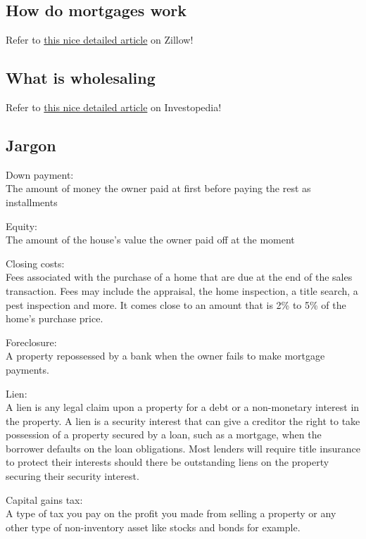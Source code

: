 \documentclass[12pt]{article}
\newcommand{\jargon}[1]{{\large\noindent\color{red} #1:}}
\begin{document}
\subsection{How do mortgages work}
Refer to \href{https://www.zillow.com/mortgage-learning/what-is-a-mortgage/}{this nice detailed article} on Zillow!
\subsection{What is wholesaling}
Refer to \href{https://www.investopedia.com/ask/answers/100214/what-goal-real-estate-wholesaling.asp}{this nice detailed article} on Investopedia!

\subsection{Jargon}
\jargon{Down payment} \\
The amount of money the owner paid at first before paying the rest as installments
\vspace{1em}

\jargon{Equity} \\
The amount of the house's value the owner paid off at the moment
\vspace{1em}

\jargon{Closing costs} \\
Fees associated with the purchase of a home that are due at the end of the sales transaction. Fees may include the appraisal, the home inspection, a title search, a pest inspection and more. It comes close to an amount that is 2\% to 5\% of the home’s purchase price.
\vspace{1em}

\jargon{Foreclosure} \\
A property repossessed by a bank when the owner fails to make mortgage payments. 
\vspace{1em}

\jargon{Lien} \\
A lien is any legal claim upon a property for a debt or a non-monetary interest in the property. A lien is a security interest that can give a creditor the right to take possession of a property secured by a loan, such as a mortgage, when the borrower defaults on the loan obligations. Most lenders will require title insurance to protect their interests should there be outstanding liens on the property securing their security interest.
\vspace{1em}

\jargon{Capital gains tax} \\
A type of tax you pay on the profit you made from selling a property or any other type of non-inventory asset like stocks and bonds for example.
\vspace{1em}
\end{document}
